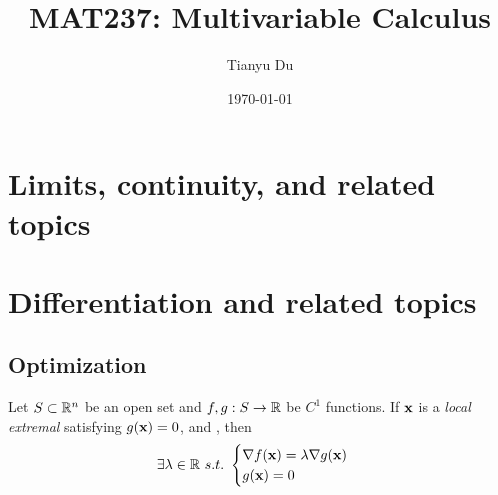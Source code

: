 \documentclass[11pt]{article}
\title{MAT237: Multivariable Calculus}
\date{\today}
\author{Tianyu Du}
\begin{document}
	\maketitle
	\tableofcontents
	\newpage
	
	\section{Limits, continuity, and related topics}
	\section{Differentiation and related topics}
		\subsection{}
		\subsection{}
		\subsection{}
		\subsection{}
		\subsection{}
		\subsection{}
		\subsection{}
		\subsection{Optimization}
			\begin{theorem}
				Let $S \subset \mathbb{R}^n$ be an open set and $f, g: S \to \mathbb{R}$ be $C^1$ functions. If $\textbf{x}$ is a \emph{local extremal} satisfying $g(\textbf{x}) = 0$, and , then
				\begin{equation}
					\exists \lambda \in \mathbb{R}\ s.t.\ \begin{cases}
						\nabla f(\textbf{x}) = \lambda \nabla g(\textbf{x}) \\
						g(\textbf{x}) = 0
					\end{cases}
				\end{equation}
			\end{theorem}
			
\end{document}
